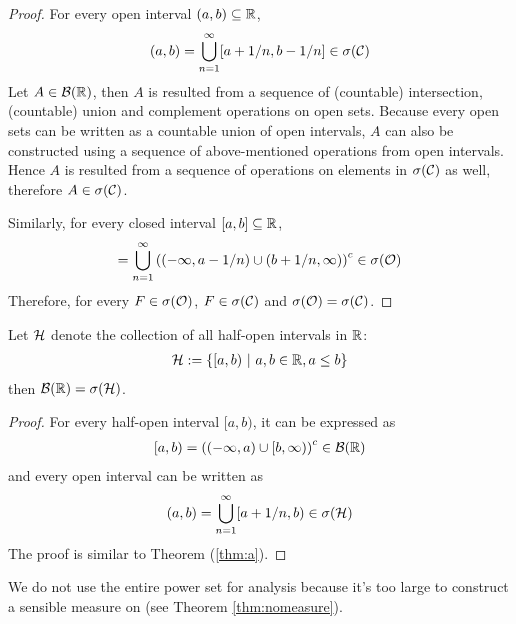 \documentclass[11pt]{article}
\numberwithin{equation}{section}
\begin{document}
    \begin{proof}
        For every open interval $(a, b) \subseteq \mathbb{R}$,
        \begin{align}
            (a, b) = \bigcup_{n=1}^\infty [a + 1/n, b - 1/n] \in \sigma(\mathcal{{C}})
        \end{align}
        Let $A \in \mathcal{{B}}(\mathbb{R})$, then $A$ is resulted from a sequence of (countable) intersection, (countable) union and complement operations on open sets.
        Because every open sets can be written as a countable union of open intervals, $A$ can also be constructed using a sequence of above-mentioned operations from open intervals. Hence $A$ is resulted from a sequence of operations on elements in $\sigma(\mathcal{{C}})$ as well, therefore $A \in \sigma(\mathcal{{C}})$.

        Similarly, for every closed interval $[a, b] \subseteq \mathbb{R}$,
        \begin{align}
            [a, b] = \bigcup_{n=1}^\infty \left(
            (-\infty, a - 1/n)
            \cup (b +1/n, \infty)
            \right)^c \in \sigma(\mc{O})
        \end{align}
        Therefore, for every $F\in \sigma(\mathcal{{O}})$, $F \in \sigma(\mathcal{{C}})$ and $\sigma(\mathcal{{O}}) = \sigma(\mathcal{{C}})$.
    \end{proof}
    
    \begin{theorem}
        Let $\mathcal{{H}}$ denote the collection of all half-open intervals in $\mathbb{R}$:
        \begin{align}
            \mathcal{{H}} := \{[a, b)\ |\ a, b \in \mathbb{R}, a \leq b\}
        \end{align}
        then $\mathcal{{B}}(\mathbb{R}) = \sigma(\mathcal{{H}})$.
    \end{theorem}

    \begin{proof}
        For every half-open interval $[a, b)$, it can be expressed as
        \begin{align}
            [a, b) = \left((-\infty, a) \cup [b, \infty) \right)^c \in \mathcal{{B}}(\mathbb{R})
        \end{align}
        and every open interval can be written as
        \begin{align}
            (a, b) = \bigcup_{n=1}^\infty [a+1/n, b) \in \sigma(\mathcal{{H}})
        \end{align}
        The proof is similar to Theorem (\ref{thm:a}).
    \end{proof}

	\begin{remark}
		We do not use the entire power set for analysis because it's too large to construct a sensible measure on (see Theorem \ref{thm:nomeasure}).
	\end{remark}
	
\end{document}
